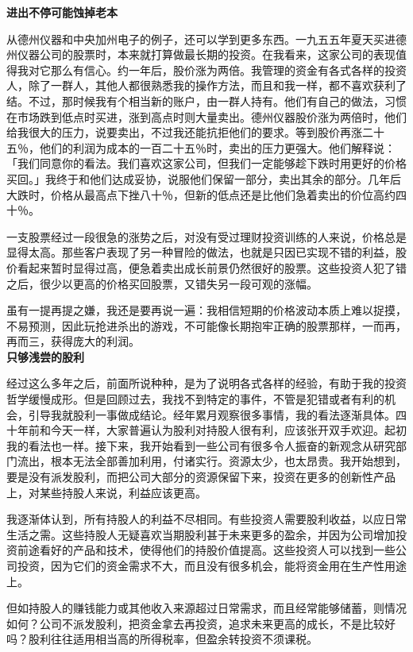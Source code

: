 \documentclass[UTF8,a4paper,zihao=-4,fontset = windows]{ctexart} %
\begin{document}
\textbf{进出不停可能蚀掉老本}


从德州仪器和中央加州电子的例子，还可以学到更多东西。一九五五年夏天买进德州仪器公司的股票时，本来就打算做最长期的投资。在我看来，这家公司的表现值得我对它那么有信心。约一年后，股价涨为两倍。我管理的资金有各式各样的投资人，除了一群人，其他人都很熟悉我的操作方法，而且和我一样，都不喜欢获利了结。不过，那时候我有个相当新的账户，由一群人持有。他们有自己的做法，习惯在市场跌到低点时买进，涨到高点时则大量卖出。德州仪器股价涨为两倍时，他们给我很大的压力，说要卖出，不过我还能抗拒他们的要求。等到股价再涨二十五％，他们的利润为成本的一百二十五％时，卖出的压力更强大。他们解释说：「我们同意你的看法。我们喜欢这家公司，但我们一定能够趁下跌时用更好的价格买回。」我终于和他们达成妥协，说服他们保留一部分，卖出其余的部分。几年后大跌时，价格从最高点下挫八十％，但新的低点还是比他们急着卖出的价位高约四十％。

一支股票经过一段很急的涨势之后，对没有受过理财投资训练的人来说，价格总是显得太高。那些客户表现了另一种冒险的做法，也就是只因已实现不错的利益，股价看起来暂时显得过高，便急着卖出成长前景仍然很好的股票。这些投资人犯了错之后，很少以更高的价格买回股票，又错失另一段可观的涨幅。

虽有一提再提之嫌，我还是要再说一遍：我相信短期的价格波动本质上难以捉摸，不易预测，因此玩抢进杀出的游戏，不可能像长期抱牢正确的股票那样，一而再，再而三，获得庞大的利润。
\\

\textbf{只够浅尝的股利}


经过这么多年之后，前面所说种种，是为了说明各式各样的经验，有助于我的投资哲学缓慢成形。但是回顾过去，我找不到特定的事件，不管是犯错或者有利的机会，引导我就股利一事做成结论。经年累月观察很多事情，我的看法逐渐具体。四十年前和今天一样，大家普遍认为股利对持股人很有利，应该张开双手欢迎。起初我的看法也一样。接下来，我开始看到一些公司有很多令人振奋的新观念从研究部门流出，根本无法全部善加利用，付诸实行。资源太少，也太昂贵。我开始想到，要是没有派发股利，而把公司大部分的资源保留下来，投资在更多的创新性产品上，对某些持股人来说，利益应该更高。

我逐渐体认到，所有持股人的利益不尽相同。有些投资人需要股利收益，以应日常生活之需。这些持股人无疑喜欢当期股利甚于未来更多的盈余，并因为公司增加投资前途看好的产品和技术，使得他们的持股价值提高。这些投资人可以找到一些公司投资，因为它们的资金需求不大，而且没有很多机会，能将资金用在生产性用途上。

但如持股人的赚钱能力或其他收入来源超过日常需求，而且经常能够储蓄，则情况如何？公司不派发股利，把资金拿去再投资，追求未来更高的成长，不是比较好吗？股利往往适用相当高的所得税率，但盈余转投资不须课税。
\end{document}
